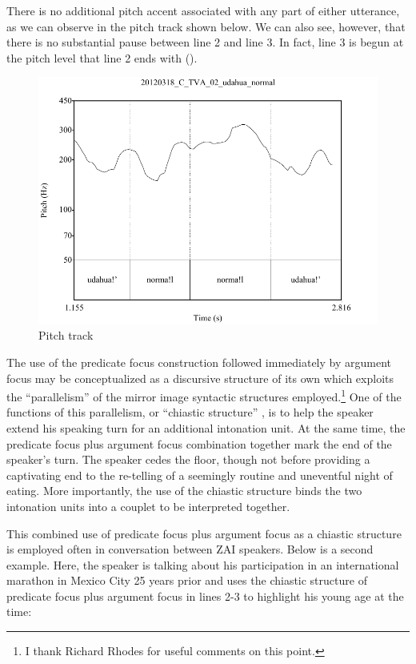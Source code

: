 There is no additional pitch accent associated with any part of either utterance, as we can observe in the pitch track shown below. We can also see, however, that there is no substantial pause between line 2 and line 3. In fact, line 3 is begun at the pitch level that line 2 ends with ().

 \begin{figure} 
\caption{Pitch track}
\label{fig:5:gudahuanormal}
 
\includegraphics[height=.4\textheight]{gudahuanormal}
 \end{figure}


The use of the predicate focus construction followed immediately by argument focus may be conceptualized as a discursive structure of its own which exploits the ``parallelism'' \citep{jakobson1966,fox1977} of the mirror image syntactic structures employed.\footnote{I thank Richard Rhodes for useful comments on this point.} One of the functions of this parallelism, or ``chiastic structure'' \citep{silverstein1984}, is to help the speaker extend his speaking turn for an additional intonation unit. At the same time, the predicate focus plus argument focus combination together mark the end of the speaker's turn. The speaker cedes the floor, though not before providing a captivating end to the re-telling of a seemingly routine and uneventful night of eating. More importantly, the use of the chiastic structure binds the two intonation units into a couplet to be interpreted together.

This combined use of predicate focus plus argument focus as a chiastic structure is employed often in conversation between ZAI speakers. Below is a second example. Here, the speaker is talking about his participation in an international marathon in Mexico City 25 years prior and uses the chiastic structure of predicate focus plus argument focus in lines 2-3 to highlight his young age at the time:

